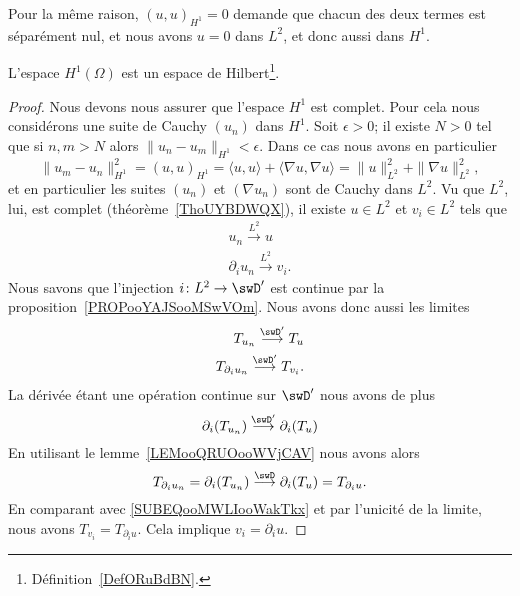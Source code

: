 Pour la même raison, \( (u,u)_{H^1}=0\) demande que chacun des deux termes est séparément nul, et nous avons \( u=0\) dans \( L^2\), et donc aussi dans \( H^1\).

\begin{theorem}
	L'espace \( H^1(\Omega)\) est un espace de Hilbert\footnote{Définition~\ref{DefORuBdBN}.}.
\end{theorem}

\begin{proof}
	Nous devons nous assurer que l'espace \( H^1\) est complet. Pour cela nous considérons une suite de Cauchy \( (u_n)\) dans \( H^1\). Soit \( \epsilon>0\); il existe \( N>0\) tel que si \( n,m>N\) alors \( \| u_n-u_m \|_{H^1}<\epsilon\). Dans ce cas nous avons en particulier
	\begin{equation}
		\| u_m-u_n \|_{H^1}^2=(u,u)_{H^1}=\langle u, u\rangle +\langle \nabla u, \nabla u\rangle =\| u \|_{L^2}^2+\| \nabla u \|_{L^2}^2,
	\end{equation}
	et en particulier les suites \( (u_n)\) et \( (\nabla u_n)\) sont de Cauchy dans \( L^2\). Vu que \( L^2\), lui, est complet (théorème~\ref{ThoUYBDWQX}), il existe \( u\in L^2\) et \( v_i\in L^2\) tels que
	\begin{subequations}
		\begin{align}
			u_n\stackrel{L^2}{\longrightarrow}u \\
			\partial_iu_n\stackrel{L^2}{\longrightarrow}v_i.
		\end{align}
	\end{subequations}
	Nous savons que l'injection \( i\colon L^2\to \swD'\) est continue par la proposition~\ref{PROPooYAJSooMSwVOm}. Nous avons donc aussi les limites
	\begin{subequations}
		\begin{align}
			T_{u_n}\stackrel{\swD'}{\longrightarrow}T_u \\
			T_{\partial_i u_n}\stackrel{\swD'}{\longrightarrow}T_{v_i}.     \label{SUBEQooMWLIooWakTkx}
		\end{align}
	\end{subequations}
	La dérivée étant une opération continue sur \( \swD'\) nous avons de plus
	\begin{equation}
		\partial_i(T_{u_n})\stackrel{\swD'}{\longrightarrow}\partial_i(T_u)
	\end{equation}
	En utilisant le lemme~\ref{LEMooQRUOooWVjCAV} nous avons alors
	\begin{equation}
		T_{\partial_iu_n}=\partial_i(T_{u_n})\stackrel{\swD}{\longrightarrow}\partial_i(T_u)=T_{\partial_iu}.
	\end{equation}
	En comparant avec \eqref{SUBEQooMWLIooWakTkx} et par l'unicité de la limite, nous avons \( T_{v_i}=T_{\partial_iu}\). Cela implique \( v_i=\partial_iu\).


\end{proof}
